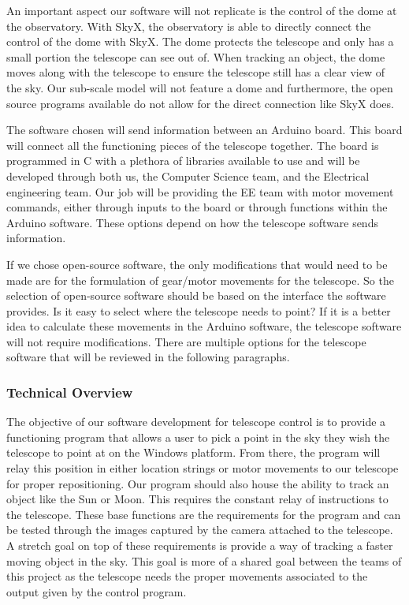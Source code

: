 \documentclass[12pt]{article}
\begin{document}
An important aspect our software will not replicate is the control of the dome at the observatory. With SkyX, the observatory is able to directly connect the control of the dome with SkyX. The dome protects the telescope and only has a small portion the telescope can see out of. When tracking an object, the dome moves along with the telescope to ensure the telescope still has a clear view of the sky. Our sub-scale model will not feature a dome and furthermore, the open source programs available do not allow for the direct connection like SkyX does.

The software chosen will send information between an Arduino board. This board will connect all the functioning pieces of the telescope together. The board is programmed in C with a plethora of libraries available to use and will be developed through both us, the Computer Science team, and the Electrical engineering team. Our job will be providing the EE team with motor movement commands, either through inputs to the board or through functions within the Arduino software. These options depend on how the telescope software sends information.

If we chose open-source software, the only modifications that would need to be made are for the formulation of gear/motor movements for the telescope. So the selection of open-source software should be based on the interface the software provides. Is it easy to select where the telescope needs to point? If it is a better idea to calculate these movements in the Arduino software, the telescope software will not require modifications. There are multiple options for the telescope software that will be reviewed in the following paragraphs.

\subsubsection{Technical Overview}

The objective of our software development for telescope control is to provide a functioning program that allows a user to pick a point in the sky they wish the telescope to point at on the Windows platform. From there, the program will relay this position in either location strings or motor movements to our telescope for proper repositioning. Our program should also house the ability to track an object like the Sun or Moon. This requires the constant relay of instructions to the telescope. These base functions are the requirements for the program and can be tested through the images captured by the camera attached to the telescope. A stretch goal on top of these requirements is provide a way of tracking a faster moving object in the sky. This goal is more of a shared goal between the teams of this project as the telescope needs the proper movements associated to the output given by the control program.
\end{document}
